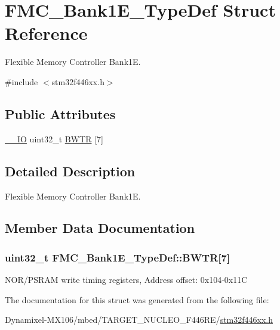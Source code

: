 \hypertarget{struct_f_m_c___bank1_e___type_def}{}\section{F\+M\+C\+\_\+\+Bank1\+E\+\_\+\+Type\+Def Struct Reference}
\label{struct_f_m_c___bank1_e___type_def}


Flexible Memory Controller Bank1E.  




{\ttfamily \#include $<$stm32f446xx.\+h$>$}

\subsection*{Public Attributes}
\begin{DoxyCompactItemize}
\item 
\hyperlink{core__sc300_8h_aec43007d9998a0a0e01faede4133d6be}{\+\_\+\+\_\+\+IO} uint32\+\_\+t \hyperlink{struct_f_m_c___bank1_e___type_def_abd27ba74f0c9b180f713e7fad065a8d9}{B\+W\+TR} \mbox{[}7\mbox{]}
\end{DoxyCompactItemize}


\subsection{Detailed Description}
Flexible Memory Controller Bank1E. 

\subsection{Member Data Documentation}
\subsubsection[{\texorpdfstring{B\+W\+TR}{BWTR}}]{ uint32\+\_\+t F\+M\+C\+\_\+\+Bank1\+E\+\_\+\+Type\+Def\+::\+B\+W\+TR\mbox{[}7\mbox{]}}\hypertarget{struct_f_m_c___bank1_e___type_def_abd27ba74f0c9b180f713e7fad065a8d9}{}\label{struct_f_m_c___bank1_e___type_def_abd27ba74f0c9b180f713e7fad065a8d9}
N\+O\+R/\+P\+S\+R\+AM write timing registers, Address offset\+: 0x104-\/0x11C 

The documentation for this struct was generated from the following file\+:\begin{DoxyCompactItemize}
\item 
Dynamixel-\/\+M\+X106/mbed/\+T\+A\+R\+G\+E\+T\+\_\+\+N\+U\+C\+L\+E\+O\+\_\+\+F446\+R\+E/\hyperlink{stm32f446xx_8h}{stm32f446xx.\+h}\end{DoxyCompactItemize}
